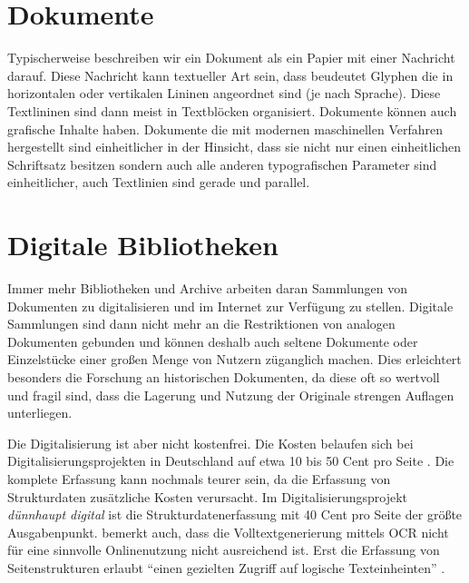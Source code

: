 \section{Dokumente}
Typischerweise beschreiben wir ein Dokument als ein Papier mit einer Nachricht darauf. Diese Nachricht kann textueller Art sein, dass beudeutet Glyphen die in horizontalen oder vertikalen Lininen angeordnet sind (je nach Sprache)\parencite{BairdBriefHistoryDocuments2014}. Diese Textlininen sind dann meist in Textblöcken organisiert. Dokumente können auch grafische Inhalte haben. 
Dokumente die mit modernen maschinellen Verfahren hergestellt sind einheitlicher in der Hinsicht, dass sie nicht nur einen einheitlichen Schriftsatz besitzen sondern auch alle anderen typografischen Parameter sind einheitlicher, auch Textlinien sind gerade und parallel.  

\section{Digitale Bibliotheken}
Immer mehr Bibliotheken und Archive arbeiten daran Sammlungen von Dokumenten zu digitalisieren und im Internet zur Verfügung zu stellen. 
Digitale Sammlungen sind dann nicht mehr an die Restriktionen von analogen Dokumenten gebunden und können deshalb auch seltene Dokumente oder Einzelstücke einer großen Menge von Nutzern züganglich machen.
Dies erleichtert besonders die Forschung an  historischen Dokumenten, da diese oft so wertvoll und fragil sind, dass die Lagerung und Nutzung der Originale strengen Auflagen unterliegen.

Die Digitalisierung ist aber nicht kostenfrei. Die Kosten belaufen sich bei Digitalisierungsprojekten in Deutschland auf etwa 10 bis 50 Cent pro Seite \parencite{OpitzWorkshopMassendigitalisierungsprojekteDeutschen2009}.
Die komplete Erfassung kann nochmals teurer sein, da die Erfassung von Strukturdaten zusätzliche Kosten verursacht. 
Im Digitalisierungsprojekt \emph{dünnhaupt digital} ist die Strukturdatenerfassung mit 40 Cent pro Seite der größte Ausgabenpunkt.
\cite{OpitzWorkshopMassendigitalisierungsprojekteDeutschen2009} bemerkt auch, dass die Volltextgenerierung mittels OCR nicht für eine sinnvolle Onlinenutzung nicht ausreichend ist. Erst die Erfassung von Seitenstrukturen erlaubt  ``einen gezielten Zugriff auf  logische Texteinheinten'' \parencite[372]{OpitzWorkshopMassendigitalisierungsprojekteDeutschen2009}.

